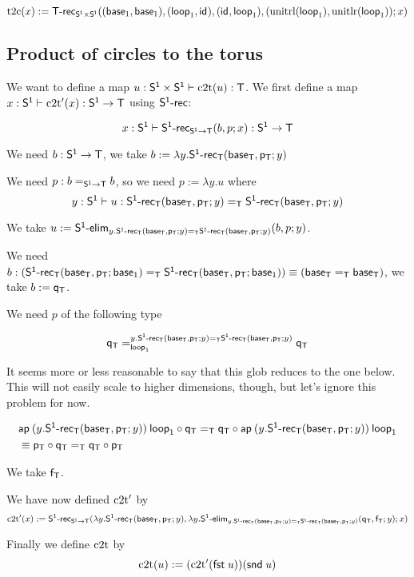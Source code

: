 \[\ttoc(x):=\dsd{T\text{-}rec}_{\PP}((\base{1},\base{1}),(\lp{1},\id{})
,(\id{},\lp{1}),(\unitrl(\lp{1}),\unitlr(\lp{1}));x)\]

\subsection{Product of circles to the torus}

We want to define a map $u:\PP\vdash\ctot(u):\dsd{T}$. We first define a map
$x:\dsd{S^1}\vdash\ctot'(x):\dsd{S^1}\to\dsd{T}$ using $\dsd{S^1\text{-}rec}$:

\[\ofglob{x:\dsd{S^1}}{\dsd{S^1\text{-}rec}_{\dsd{S^1}\to\dsd{T}}(b,p;x)}
{\dsd{S^1}\to\dsd{T}}\]

We need $b:\dsd{S^1}\to\dsd{T}$, we take
$b:=\lambda{}y.\dsd{S^1\text{-}rec}_{\dsd{T}}(\baseT,\pT;y)$

We need $p:\homj{\dsd{S^1}\to\dsd{T}}{b}{b}$, so we need $p:=\lambda y.u$ where
\[\ofglob{y:\dsd{S^1}}{u}{\homj{\dsd{T}}
  {\dsd{S^1\text{-}rec}_{\dsd{T}}(\baseT,\pT;y)}
  {\dsd{S^1\text{-}rec}_{\dsd{T}}(\baseT,\pT;y)}}\]

We take $u:=\dsd{S^1\text{-}elim}_{y.\homj{\dsd{T}}
  {\dsd{S^1\text{-}rec}_{\dsd{T}}(\baseT,\pT;y)}
  {\dsd{S^1\text{-}rec}_{\dsd{T}}(\baseT,\pT;y)}}(b,p;y)$.

We need $b:(\homj{\dsd{T}}
{\dsd{S^1\text{-}rec}_{\dsd{T}}(\baseT,\pT;\base{1})}
{\dsd{S^1\text{-}rec}_{\dsd{T}}(\baseT,\pT;\base{1})})
\equiv(\homj{\dsd{T}}{\baseT}{\baseT})$, we take $b:=\qT$.

We need $p$ of the following type

\[\dhomj{y.\homj{\dsd{T}}
  {\dsd{S^1\text{-}rec}_{\dsd{T}}(\baseT,\pT;y)}
  {\dsd{S^1\text{-}rec}_{\dsd{T}}(\baseT,\pT;y)}}{\qT}{\qT}{\lp{1}}\]

It seems more or less reasonable to say that this glob reduces to the one
below. This will not easily scale to higher dimensions, though, but let’s
ignore this problem for now.

\begin{align*}
  &\homj{\dsd{T}}{\ap{(y.\dsd{S^1\text{-}rec}_{\dsd{T}}(\baseT,\pT;y))}
    {\lp{1}}\circ\qT}
  {\qT\circ\ap{(y.\dsd{S^1\text{-}rec}_{\dsd{T}}(\baseT,\pT;y))} {\lp{1}}}
  \\
  &\equiv \homj{\dsd{T}}{\pT\circ\qT}{\qT\circ\pT}
\end{align*}

We take $\fT$.

We have now defined $\ctot'$ by
\[\ctot'(x):=\dsd{S^1\text{-}rec}_{\dsd{S^1}\to\dsd{T}}
(\lambda{}y.\dsd{S^1\text{-}rec}_{\dsd{T}}(\baseT,\pT;y),
\lambda{}y.\dsd{S^1\text{-}elim}_{y.\homj{\dsd{T}}
  {\dsd{S^1\text{-}rec}_{\dsd{T}}(\baseT,\pT;y)}
  {\dsd{S^1\text{-}rec}_{\dsd{T}}(\baseT,\pT;y)}}(\qT,\fT;y);x)\]

Finally we define $\ctot$ by
\[\ctot(u):=(\ctot'(\fst u))(\snd u)\]


